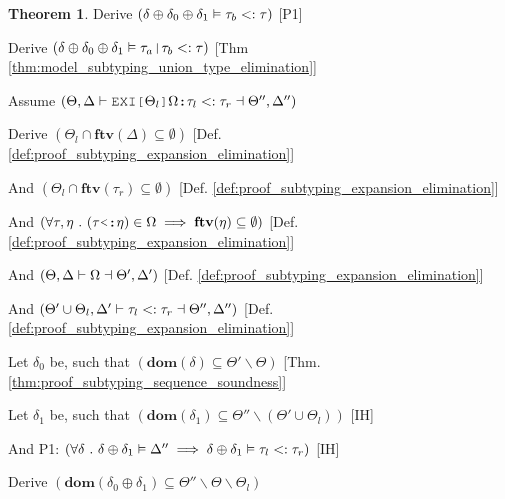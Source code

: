 \documentclass[acmsmall]{acmart}
\theoremstyle{definition}
\newtheorem{theorem}{Theorem}[section]
\begin{document}
\begin{theorem}
  \item \I\I \N Derive $(
    \delta \oplus \delta_0 \oplus \delta_1 \vDash \tau_b <: \tau
  )$ [P1]

  \item \I\I \N Derive $(
    \delta \oplus \delta_0 \oplus \delta_1 \satisfies \tau_a \J{|} \tau_b \subtypes \tau
  )$ [Thm \ref{thm:model_subtyping_union_type_elimination}]



  \item \N Assume $(
    \Theta, \Delta \entails
    \J{EXI[}\Theta_l\J{]}\Omega \J{:} \tau_l \subtypes \tau_r
    \given \Theta'', \Delta'' 
  )$

  \item \I \N Derive $(
    \Theta_l \cap \textbf{ftv}(\Delta) \subseteq \emptyset 
  )$ [Def. \ref{def:proof_subtyping_expansion_elimination}]
  \item \I \N And $(
    \Theta_l \cap \textbf{ftv}(\tau_r) \subseteq \emptyset
  )$ [Def. \ref{def:proof_subtyping_expansion_elimination}]
  \item \I \N And $(
    \forall \tau, \eta \qua (\tau \J{<:} \eta) \in \Omega \implies \textbf{ftv}(\eta) \subseteq \emptyset
  )$ [Def. \ref{def:proof_subtyping_expansion_elimination}]
  \item \I \N And $(
    \Theta, \Delta \vdash \Omega \dashv \Theta', \Delta'
  )$ [Def. \ref{def:proof_subtyping_expansion_elimination}]
  \item \I \N And $(
    \Theta' \cup \Theta_l, \Delta' \vdash
    \tau_l <: \tau_r \dashv \Theta'', \Delta''
  )$ [Def. \ref{def:proof_subtyping_expansion_elimination}]


  \item \I \N Let $\delta_0$ be, such that $(
    \textbf{dom}(\delta) \subseteq \Theta' \backslash \Theta
  )$ [Thm. \ref{thm:proof_subtyping_sequence_soundness}]

  \item \I \N Let $\delta_1$ be, such that $(
    \textbf{dom}(\delta_1) \subseteq \Theta'' \backslash (\Theta' \cup \Theta_l)
  )$ [IH]


  \item \I \N And P1: $(
    \forall \delta \ .\ 
    \delta \oplus \delta_1 \vDash \Delta''
    \implies
    \delta \oplus \delta_1 \vDash \tau_l <: \tau_r
  )$ [IH]

  \item \I \N Derive $(
    \textbf{dom}(\delta_0 \oplus \delta_1) \subseteq \Theta'' \backslash \Theta \backslash \Theta_l
  )$


\end{theorem}
\end{document}
